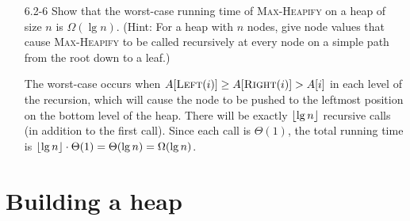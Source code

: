 \begin{enumerate}
\begin{framed}
\begin{algorithm}[H]
\SetAlgoNoEnd\DontPrintSemicolon
\BlankLine
{}
\end{algorithm}
\end{framed}

\item[6.2-6]{Show that the worst-case running time of \textsc{Max-Heapify} on a
heap of size $n$ is $\Omega(\lg n)$. (Hint: For a heap with $n$ nodes, give node
values that cause \textsc{Max-Heapify} to be called recursively at every node on
a simple path from the root down to a leaf.)}

\begin{framed}
The worst-case occurs when $A[\textsc{Left}(i)] \ge A[\textsc{Right}(i)] > A[i]$
in each level of the recursion, which will cause the node to be pushed to the
leftmost position on the bottom level of the heap. There will be exactly
$\lfloor\lg n\rfloor$ recursive calls (in addition to the first call). Since each call
is $\Theta(1)$, the total running time is
$\lfloor\lg n\rfloor \cdot \Theta(1) = \Theta(\lg n) = \Omega(\lg n)$.
\end{framed}

\end{enumerate}

\newpage

\section{Building a heap}

